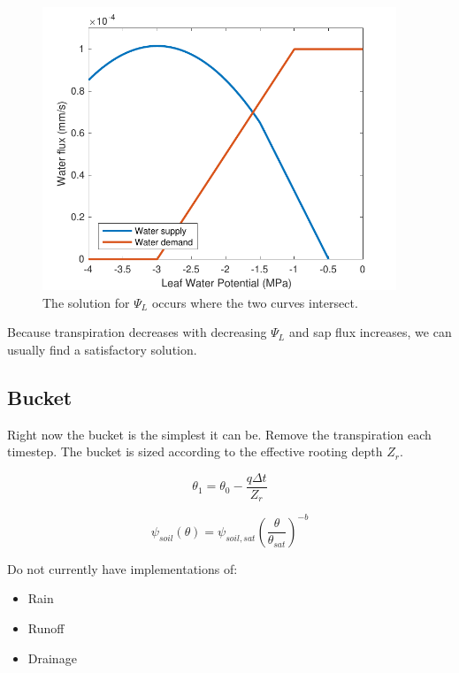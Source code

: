 \documentclass[11pt]{article}
\begin{document}
\begin{figure}[h]
\centering
\includegraphics[width=25pc]{../figs/spac_solution}
\caption{The solution for $\Psi_L$ occurs where the two curves intersect.}
\label{fig:soln}
\end{figure}

Because transpiration decreases with decreasing $\Psi_L$ and sap flux increases, we can usually find a satisfactory solution. 

\clearpage
\subsection{Bucket}

Right now the bucket is the simplest it can be. Remove the transpiration each timestep. The bucket is sized according to the effective rooting depth $Z_r$.

\begin{equation}
\theta_1 = \theta_0 - \dfrac{q\Delta t}{Z_r}
\end{equation}

\begin{equation}
\psi_{soil}\left(\theta\right) = \psi_{soil,sat}\left(\dfrac{\theta}{\theta_{sat}}\right)^{-b}
\end{equation}

Do not currently have implementations of:
\begin{itemize}
\item Rain
\item Runoff
\item Drainage
\end{itemize}
\end{document}

